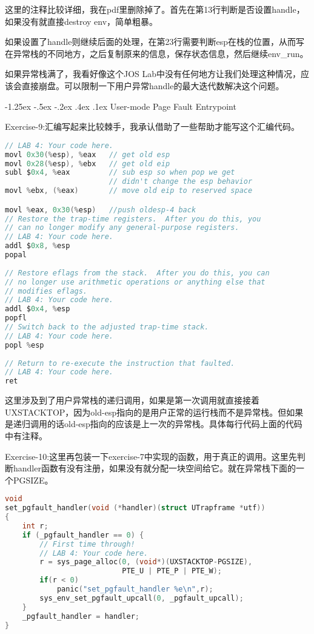 \documentclass[11pt,a4paper]{article}
\makeatletter
\newcommand{\sihao}{\fontsize{14pt}{\baselineskip}\selectfont}
\renewcommand\subsection{\@startsection{subsection}{1}{\z@}%
{-1.25ex \@plus -.5ex \@minus -.2ex}%
{.4ex \@plus .1ex}%
{\normalfont\sihao\fontspec{黑体}}}
\makeatother
\begin{document}
这里的注释比较详细，我在pdf里删除掉了。首先在第13行判断是否设置handle，如果没有就直接destroy env，简单粗暴。

如果设置了handle则继续后面的处理，在第23行需要判断esp在栈的位置，从而写在异常栈的不同地方，之后复制原来的信息，保存状态信息，然后继续env\_run。

如果异常栈满了，我看好像这个JOS Lab中没有任何地方让我们处理这种情况，应该会直接崩盘。可以限制一下用户异常handle的最大迭代数解决这个问题。

\subsection{User-mode Page Fault Entrypoint}

\color{red}Exercise-9:\color{black}汇编写起来比较棘手，我承认借助了一些帮助才能写这个汇编代码。

\setmainfont{Consolas}
\begin{lstlisting}[language={C},firstnumber=1,title=lib/pfentry.c] 
// LAB 4: Your code here.
movl 0x30(%esp), %eax   // get old esp
movl 0x28(%esp), %ebx	// get old eip
subl $0x4, %eax			// sub esp so when pop we get
						// didn't change the esp behavior
movl %ebx, (%eax)		// move old eip to reserved space

movl %eax, 0x30(%esp)	//push oldesp-4 back
// Restore the trap-time registers.  After you do this, you
// can no longer modify any general-purpose registers.
// LAB 4: Your code here.
addl $0x8, %esp
popal
	
// Restore eflags from the stack.  After you do this, you can
// no longer use arithmetic operations or anything else that
// modifies eflags.
// LAB 4: Your code here.
addl $0x4, %esp
popfl
// Switch back to the adjusted trap-time stack.
// LAB 4: Your code here.
popl %esp
	
// Return to re-execute the instruction that faulted.
// LAB 4: Your code here.
ret
\end{lstlisting}
\setmainfont[BoldFont=黑体]{宋体}

这里涉及到了用户异常栈的递归调用，如果是第一次调用就直接接着UXSTACKTOP，因为old-esp指向的是用户正常的运行栈而不是异常栈。但如果是递归调用的话old-esp指向的应该是上一次的异常栈。具体每行代码上面的代码中有注释。

\color{red}Exercise-10:\color{black}这里再包装一下exercise-7中实现的函数，用于真正的调用。这里先判断handler函数有没有注册，如果没有就分配一块空间给它。就在异常栈下面的一个PGSIZE。

\setmainfont{Consolas}
\begin{lstlisting}[language={C},firstnumber=1,title=lib/pgfault.c]
void
set_pgfault_handler(void (*handler)(struct UTrapframe *utf))
{
	int r;
	if (_pgfault_handler == 0) {
		// First time through!
		// LAB 4: Your code here.
		r = sys_page_alloc(0, (void*)(UXSTACKTOP-PGSIZE),
						   PTE_U | PTE_P | PTE_W);
		if(r < 0)
			panic("set_pgfault_handler %e\n",r);
		sys_env_set_pgfault_upcall(0, _pgfault_upcall);
	}
	_pgfault_handler = handler;
}
\end{lstlisting}
\setmainfont[BoldFont=黑体]{宋体}
\end{document}
